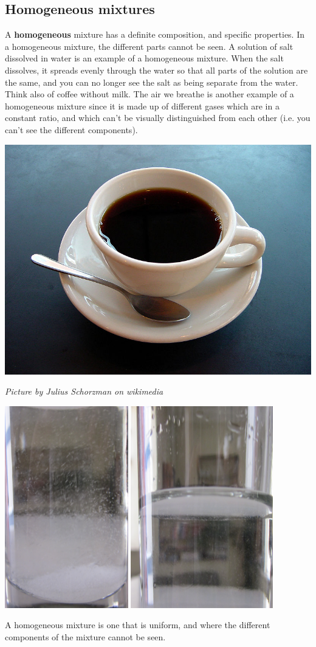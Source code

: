             \subsection*{Homogeneous mixtures}
            \nopagebreak
        \label{m38708*id62762}A \textbf{homogeneous} mixture has a definite composition, and specific properties. In a homogeneous mixture, the different parts cannot be seen. A solution of salt dissolved in water is an example of a homogeneous mixture. When the salt dissolves, it spreads evenly through the water so that all parts of the solution are the same, and you can no longer see the salt as being separate from the water. Think also of coffee without milk. The air we breathe is another example of a homogeneous mixture since it is made up of different gases which are in a constant ratio, and which can't be visually distinguished from each other (i.e. you can't see the different components).\par 
\begin{minipage}{.5\textwidth}
\begin{center}
 \includegraphics[width=.3\textwidth]{photos/coffeeby_JuliusSchorzman_wikimedia.jpg}\par
\textit{Picture by Julius Schorzman on wikimedia}
\end{center}
\end{minipage}
\begin{minipage}{.5\textwidth}
\begin{center}
 \includegraphics[width=.5\textwidth]{photos/saltwater.png}\par
\end{center}
\end{minipage}
\label{m38708*fhsst!!!underscore!!!id96} { \label{m38708*meaningfhsst!!!underscore!!!id96}
        A homogeneous mixture is one that is uniform, and where the different components of the mixture cannot be seen. 
         } 
